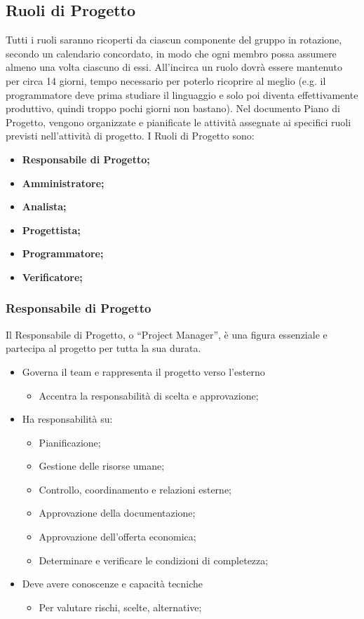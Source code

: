 \subsection{Ruoli di Progetto}
Tutti i ruoli saranno ricoperti da ciascun componente del gruppo in rotazione, secondo un calendario concordato, in modo che ogni membro possa assumere almeno una volta ciascuno di essi. All'incirca un ruolo dovrà essere mantenuto per circa 14 giorni, tempo necessario per poterlo ricoprire al meglio (e.g. il programmatore deve prima studiare il linguaggio e solo poi diventa effettivamente produttivo, quindi troppo pochi giorni non bastano).
Nel documento Piano di Progetto, vengono organizzate e pianificate le attività assegnate ai specifici ruoli previsti nell’attività di progetto. I Ruoli di Progetto sono:
\begin{itemize}
\item{\textbf{Responsabile di Progetto;}}
\item{\textbf{Amministratore;}}
\item{\textbf{Analista;}}
\item{\textbf{Progettista;}}
\item{\textbf{Programmatore;}}
\item{\textbf{Verificatore;}}
\end{itemize}

\subsubsection{Responsabile di Progetto}
Il Responsabile di Progetto,  o  “Project  Manager”,  è una figura essenziale e partecipa al  progetto per tutta la sua durata.  
\begin{itemize}
\item{Governa il team e rappresenta il progetto verso l'esterno}
	\begin{itemize}
	\item{Accentra la responsabilità di scelta e approvazione;}
	\end{itemize}
\item{Ha responsabilità su:}
	\begin{itemize}
	\item{Pianificazione;}
	\item{Gestione delle risorse umane;}
	\item{Controllo, coordinamento e relazioni esterne;}
	\item{Approvazione della documentazione;}
	\item{Approvazione dell’offerta economica;}
	\item{Determinare e verificare le condizioni di completezza;}
	\end{itemize}
\item{Deve avere conoscenze e capacità tecniche}
	\begin{itemize}
	\item{Per valutare rischi, scelte, alternative;}
	\end{itemize}
\end{itemize}

